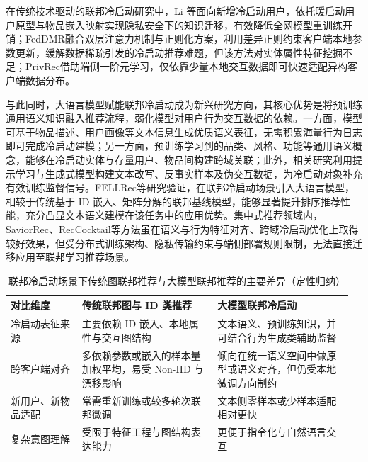 在传统技术驱动的联邦冷启动研究中，Li 等\cite{li2025frcsu}面向新增冷启动用户，依托暖启动用户原型与物品嵌入映射实现隐私安全下的知识迁移，有效降低全网模型重训练开销；FedDMR\cite{feddmr2025}融合双层注意力机制与正则化方案，利用差异正则约束客户端本地参数更新，缓解数据稀疏引发的冷启动推荐难题，但该方法对实体属性特征挖掘不足；PrivRec\cite{wang2021privrec}借助端侧一阶元学习，仅依靠少量本地交互数据即可快速适配异构客户端数据分布。

与此同时，大语言模型赋能联邦冷启动成为新兴研究方向，其核心优势是将预训练通用语义知识融入推荐流程，弱化模型对用户行为交互数据的依赖。一方面，模型可基于物品描述、用户画像等文本信息生成优质语义表征，无需积累海量行为日志即可完成冷启动建模；另一方面，预训练学习到的品类、风格、功能等通用语义概念，能够在冷启动实体与存量用户、物品间构建跨域关联；此外，相关研究利用提示学习与生成式模型构建文本改写、反事实样本及伪交互数据，为冷启动对象补充有效训练监督信号。FELLRec\cite{fellrec2025}等研究验证，在联邦冷启动场景引入大语言模型，相较于传统基于 ID 嵌入、矩阵分解的联邦基线模型，能够显著提升排序推荐性能，充分凸显文本语义建模在该任务中的应用优势。集中式推荐领域内，SaviorRec\cite{saviorrec2025}、RecCocktail\cite{reccocktail2025}等方法虽在语义与行为特征对齐、跨域冷启动优化上取得较好效果，但受分布式训练架构、隐私传输约束与端侧部署规则限制，无法直接迁移应用至联邦学习推荐场景。

\begin{table}[H]
    \centering
    \caption{联邦冷启动场景下传统图联邦推荐与大模型联邦推荐的主要差异（定性归纳）}
    \label{tab:federated_cold_llm_compare}
    \small
    {\renewcommand{\arraystretch}{0.92}
    \begin{tabular}{p{0.20\linewidth}p{0.38\linewidth}p{0.38\linewidth}}
        \toprule
        对比维度 & 传统联邦图与 ID 类推荐 & 大模型联邦冷启动 \\
        \midrule
        冷启动表征来源 & 主要依赖 ID 嵌入、本地属性与交互图结构 & 文本语义、预训练知识，并可结合行为生成类辅助监督 \\
        跨客户端对齐 & 多依赖参数或嵌入的样本量加权平均，易受 Non-IID 与漂移影响 & 倾向在统一语义空间中做原型或语义对齐，但仍受本地微调方向制约 \\
        新用户、新物品适配 & 常需重新训练或较多轮次联邦微调 & 文本侧零样本或少样本适配相对更快 \\
        复杂意图理解 & 受限于特征工程与图结构表达能力 & 更便于指令化与自然语言交互 \\
        \bottomrule
    \end{tabular}}
\end{table}

